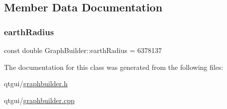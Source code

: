 \subsection{Member Data Documentation}
\mbox{\label{classdeprecated_1_1_graph_builder_a16076357d9b569b4c2a0fb58b34774b0}} 
\subsubsection{\texorpdfstring{earthRadius}{earthRadius}}
{\footnotesize\ttfamily const double Graph\+Builder\+::earth\+Radius = 6378137\hspace{0.3cm}{\ttfamily [static]}}



The documentation for this class was generated from the following files\+:\begin{DoxyCompactItemize}
\item 
qtgui/\mbox{\hyperlink{graphbuilder_8h}{graphbuilder.\+h}}\item 
qtgui/\mbox{\hyperlink{graphbuilder_8cpp}{graphbuilder.\+cpp}}\end{DoxyCompactItemize}
